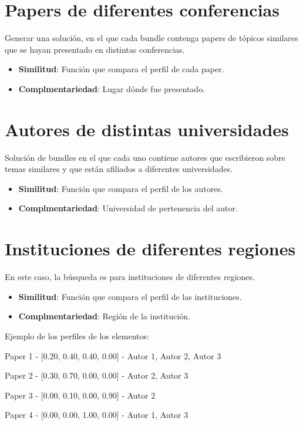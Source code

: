 \section{Papers de diferentes conferencias}\label{bus:papSimDisLug}
Generar una solución, en el que cada bundle contenga papers de tópicos similares que se hayan presentado en distintas conferencias.\\
\begin{itemize}
  \item \textbf{Similitud}: Función que compara el perfil de cada paper.
  \item \textbf{Complmentariedad}: Lugar dónde fue presentado.
\end{itemize}

\section{Autores de distintas universidades}
Solución de bundles en el que cada uno contiene autores que escribieron sobre temas similares y que están afiliados a diferentes universidades.\\
\begin{itemize}
  \item \textbf{Similitud}: Función que compara el perfil de los autores.
  \item \textbf{Complmentariedad}: Universidad de pertenencia del autor.
\end{itemize}

\section{Instituciones de diferentes regiones}
En este caso, la búsqueda es para instituciones de diferentes regiones. 
\begin{itemize}
  \item \textbf{Similitud}: Función que compara el perfil de las instituciones.
  \item \textbf{Complmentariedad}: Región de la institución.
\end{itemize}


Ejemplo de los perfiles de los elementos:

\begin{description}
 \item[Paper - Topic Profile - Autores]
 \item Paper 1 - $[$0.20, 0.40, 0.40, 0.00$]$ - Autor 1, Autor 2, Autor 3
 \item Paper 2 - $[$0.30, 0.70, 0.00, 0.00$]$ - Autor 2, Autor 3
 \item Paper 3 - $[$0.00, 0.10, 0.00, 0.90$]$ - Autor 2
 \item Paper 4 - $[$0.00, 0.00, 1.00, 0.00$]$ - Autor 1, Autor 3
\end{description}

